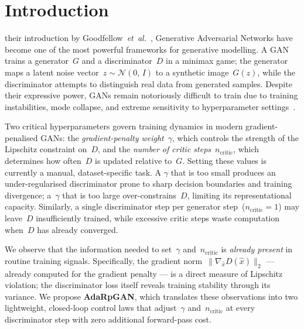 \documentclass[journal]{IEEEtran}
\newcommand{\ncritic}{n_{\mathrm{critic}}}
\begin{document}
\section{Introduction}
\label{sec:intro}

 their introduction by Goodfellow~\textit{et~al.}~\cite{goodfellow2014generative}, Generative Adversarial Networks have become one of the most powerful frameworks for generative modelling. A GAN trains a generator~$G$ and a discriminator~$D$ in a minimax game; the generator maps a latent noise vector~$z\!\sim\!\mathcal{N}(0,\,I)$ to a synthetic image~$G(z)$, while the discriminator attempts to distinguish real data from generated samples. Despite their expressive power, GANs remain notoriously difficult to train due to training instabilities, mode collapse, and extreme sensitivity to hyperparameter settings~\cite{mescheder2018training}.

Two critical hyperparameters govern training dynamics in modern gradient-penalised GANs: the \emph{gradient-penalty weight}~$\gamma$, which controls the strength of the Lipschitz constraint on~$D$, and the \emph{number of critic steps}~$\ncritic$, which determines how often~$D$ is updated relative to~$G$. Setting these values is currently a manual, dataset-specific task. A $\gamma$ that is too small produces an under-regularised discriminator prone to sharp decision boundaries and training divergence; a~$\gamma$ that is too large over-constrains~$D$, limiting its representational capacity. Similarly, a single discriminator step per generator step~($\ncritic\!=\!1$) may leave~$D$ insufficiently trained, while excessive critic steps waste computation when~$D$ has already converged.

We observe that the information needed to set~$\gamma$ and~$\ncritic$ is \emph{already present} in routine training signals. Specifically, the gradient norm~$\|\nabla_{\hat{x}} D(\hat{x})\|_2$ --- already computed for the gradient penalty --- is a direct measure of Lipschitz violation; the discriminator loss itself reveals training stability through its variance. We propose \textbf{AdaRpGAN}, which translates these observations into two lightweight, closed-loop control laws that adjust~$\gamma$ and~$\ncritic$ at every discriminator step with zero additional forward-pass cost.
\end{document}
